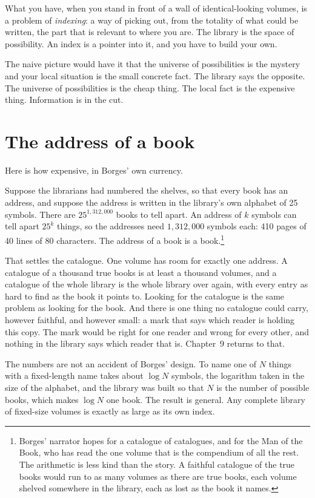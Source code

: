 What you have, when you stand in front of a wall of identical-looking volumes, is a problem of \emph{indexing}: a way of picking out, from the totality of what could be written, the part that is relevant to where you are. The library is the space of possibility. An index is a pointer into it, and you have to build your own.

The naive picture would have it that the universe of possibilities is the mystery and your local situation is the small concrete fact. The library says the opposite. The universe of possibilities is the cheap thing. The local fact is the expensive thing. Information is in the cut.

\section*{The address of a book}

Here is how expensive, in Borges' own currency.

Suppose the librarians had numbered the shelves, so that every book has an address, and suppose the address is written in the library's own alphabet of 25 symbols. There are $25^{1{,}312{,}000}$ books to tell apart. An address of $k$ symbols can tell apart $25^k$ things, so the addresses need $1{,}312{,}000$ symbols each: 410 pages of 40 lines of 80 characters. The address of a book is a book.\footnote{Borges' narrator hopes for a catalogue of catalogues, and for the Man of the Book, who has read the one volume that is the compendium of all the rest. The arithmetic is less kind than the story. A faithful catalogue of the true books would run to as many volumes as there are true books, each volume shelved somewhere in the library, each as lost as the book it names.}

That settles the catalogue. One volume has room for exactly one address. A catalogue of a thousand true books is at least a thousand volumes, and a catalogue of the whole library is the whole library over again, with every entry as hard to find as the book it points to. Looking for the catalogue is the same problem as looking for the book. And there is one thing no catalogue could carry, however faithful, and however small: a mark that says which reader is holding this copy. The mark would be right for one reader and wrong for every other, and nothing in the library says which reader that is. Chapter~9 returns to that.

The numbers are not an accident of Borges' design. To name one of $N$ things with a fixed-length name takes about $\log N$ symbols, the logarithm taken in the size of the alphabet, and the library was built so that $N$ is the number of possible books, which makes $\log N$ one book. The result is general. Any complete library of fixed-size volumes is exactly as large as its own index.

